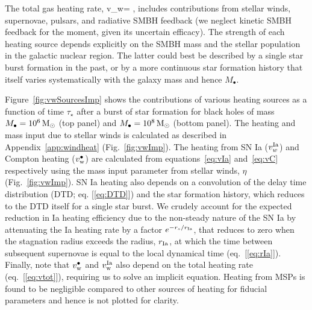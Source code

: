 \documentclass[usenatbib,fleqn]{mn2e}
\newcommand{\rs}{r_s}
\newcommand{\Mbh}[1][]{M_{\bullet#1}}
\newcommand{\rIa}{r_{\rm Ia}}
\newcommand{\vwO}{v_{w}}
\begin{document}
The total gas heating rate, 
\be
\vwO = ,
\label{eq:vtot}
\ee
includes contributions from stellar winds, supernovae, pulsars, and radiative SMBH feedback (we neglect kinetic SMBH feedback for the moment, given its uncertain efficacy).  The strength of each heating source depends explicitly on the SMBH mass and the stellar population in the galactic nuclear region.  The latter could best be described by a single star burst formation in the past, or by a more continuous star formation history that itself varies systematically with the galaxy mass and hence $\Mbh$.

Figure~\ref{fig:vwSourcesImp} shows the contributions of various heating sources as a function of time $\tau_{\star}$ after a burst of star formation for black holes of mass $\Mbh = 10^{6} \Msun$ (top panel) and $\Mbh = 10^{8} \Msun$ (bottom panel). The heating and mass input due to stellar winds is calculated as described in Appendix~\ref{app:windheat} (Fig.~\ref{fig:vwImp}).  The heating from SN Ia ($v_{w}^{\rm Ia}$) and Compton heating ($v_{\rm w}^{\bullet}$) are calculated from equations~\eqref{eq:vIa} and~\eqref{eq:vC} respectively using the mass input parameter from stellar winds, $\eta$ (Fig.~\ref{fig:vwImp}).  SN Ia heating also depends on a convolution of the delay time distribution (DTD; eq. [\ref{eq:DTD}]) and the star formation history, which reduces to the DTD itself for a single star burst.  We crudely account for the expected reduction in Ia heating efficiency due to the non-steady nature of the SN Ia by attenuating the Ia heating rate by a factor $e^{-\rs/\rIa}$, that reduces to zero when the stagnation radius exceeds the radius, $r_{\rm Ia}$, at which the time between subsequent supernovae is equal to the local dynamical time (eq.~[\ref{eq:rIa}]).  Finally, note that $v_{\rm w}^{\bullet}$ and $v_{\rm w}^{\rm Ia}$ also depend on the total heating rate (eq.~[\ref{eq:vtot}]), requiring us to solve an implicit equation.  Heating from MSPs is found to be negligible compared to other sources of heating for fiducial parameters and hence is not plotted for clarity.  
\end{document}
